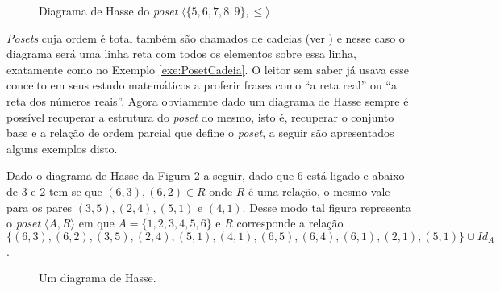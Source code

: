 \begin{figure}[h]
  \centering
  \caption{Diagrama de Hasse do \textit{poset} $\langle \{5, 6, 7, 8, 9\}, \leq \rangle$}
  \label{fig:DiagramaHasse4}
\end{figure}

\textit{Posets} cuja ordem é total também são chamados de cadeias (ver \cite{abe1991-TC, morgado1962poset}) e nesse caso o diagrama será uma linha reta com todos os elementos sobre essa linha, exatamente como no Exemplo \ref{exe:PosetCadeia}. O leitor sem saber já usava esse conceito em seus estudo matemáticos a proferir frases como ``a reta real'' ou ``a reta dos números reais''. Agora obviamente dado um diagrama de Hasse sempre é possível recuperar a estrutura do \textit{poset} do mesmo, isto é, recuperar o conjunto base e a relação de ordem parcial que define o \textit{poset}, a seguir são apresentados alguns exemplos disto.

\begin{exemplo}
  Dado o diagrama de Hasse da Figura \ref{fig:DiagramaHasse5} a seguir,  dado que $6$ está ligado e abaixo de $3$ e $2$ tem-se que $(6,3), (6, 2) \in R$ onde $R$ é uma relação, o mesmo vale para os pares $(3, 5), (2, 4), (5, 1)$  e $(4, 1)$. Desse modo tal figura representa o \textit{poset} $\langle A, R \rangle$ em que $A = \{1, 2, 3, 4, 5, 6\}$ e $R$ corresponde a relação $\{(6,3), (6, 2), (3, 5), (2, 4), (5, 1), (4, 1), (6, 5), (6, 4), (6, 1), (2, 1), (5, 1)\} \cup Id_A$.
\end{exemplo}

\begin{figure}[h]
  \centering
  \caption{Um diagrama de Hasse.}
  \label{fig:DiagramaHasse5}
\end{figure}



